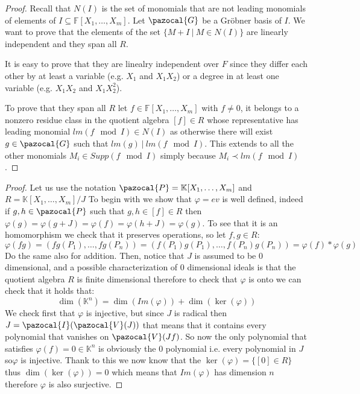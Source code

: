 \documentclass[11pt,a4paper]{report}
\theoremstyle{plain}
\theoremstyle{definition}
\newcommand{\I}{\pazocal{I}}
\newcommand{\V}{\pazocal{V}}
\newcommand{\G}{\pazocal{G}}
\begin{document}
\begin{prop-hand}[3.4.2]
\end{prop-hand}

\begin{proof}
	Recall that $N(I)$ is the set of monomials that are not leading monomials of elements of $I \subseteq \mathbb{F}[X_1,\ldots ,X_m]$. Let $\G$ be a Gr\"obner basis of $I$. We want to prove that the elements of the set $\{M + I\ |\ M\in N(I)\}$ are linearly independent and they span all $R$.
	
	It is easy to prove that they are linealry independent over $F$ since they differ each other by at least a variable (e.g. $X_1$ and $X_1X_2$) or a degree in at least one variable (e.g. $X_1X_2$ and $X_1X_2^2$).
	
	To prove that they span all $R$ let $f \in \mathbb{F}[X_1,\ldots ,X_m]$ with $f \neq 0$, it belongs to a nonzero residue class in the quotient algebra $[f] \in R$ whose representative has leading monomial $lm(f \mod I) \in N(I)$ as otherwise there will exist $g \in \G$ such that $lm(g)\ |\ lm(f \mod I)$. This extends to all the other monomials $M_i \in Supp(f \mod I)$ simply because $M_i \prec lm(f \mod I)$.
\end{proof}

\begin{ex-hand}[3.5.10]
\end{ex-hand}
\begin{proof} 
Let us use the notation $\pazocal{P} = \mathbb{K}[X_1,\ldots,X_m]$ and $R = \mathbb{K}[X_1,\ldots,X_m]/J$
To begin with we show that $\varphi = ev$ is well defined, indeed if $g,h \in \pazocal{P}$ such that $g,h \in [f] \in R$ then $\varphi(g) = \varphi(g+J) = \varphi(f) = \varphi(h + J) = \varphi(g)$.
To see that it is an homomorphism we check that it preserves operations, so let $f,g \in R$:
\[
	\varphi(fg) = (fg(P_1), \ldots,fg(P_n)) = (f(P_1)g(P_1),\ldots,f(P_n)g(P_n)) = \varphi(f)*\varphi(g)
\]
Do the same also for addition.
Then, notice that $J$ is assumed to be $0$ dimensional, and a possible characterization of $0$ dimensional ideals is that the quotient algebra $R$ is finite dimensional therefore to check that $\varphi$ is onto we can check that it holds that:
\[
	\dim(\mathbb{K}^n) = \dim(Im(\varphi)) + \dim(\ker(\varphi)) 
\]
We check first that $\varphi$ is injective, but since $J$ is radical then $J = \I(\V(J))$ that means that it contains every polynomial that vanishes on $\V(Jf)$. So now the only polynomial that satisfies $\varphi(f) = 0 \in \mathbb{K}^n$ is obviously the $0$ polynomial i.e. every polynomial in $J$ so$\varphi$ is injective.
Thank to this we now know that the $\ker(\varphi) = \{[0] \in R\}$ thus $\dim(\ker(\varphi))=0$ which means that $Im(\varphi)$ has dimension $n$ therefore $\varphi$ is also surjective.
\end{proof}
\end{document}
